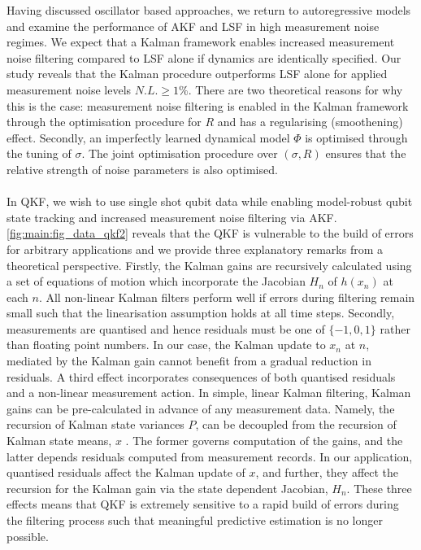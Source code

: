 Having discussed oscillator based approaches, we return to autoregressive models and examine the performance of AKF and LSF in high measurement noise regimes. We expect that a Kalman framework enables increased measurement noise filtering compared to LSF alone if dynamics are identically specified.  Our study reveals that the Kalman procedure outperforms LSF alone for applied measurement noise levels $N.L. \geq 1\%$. There are two theoretical reasons for why this is the case: measurement noise filtering is enabled in the Kalman framework through the optimisation procedure for $R$ and has a regularising (smoothening) effect. Secondly, an imperfectly learned dynamical model $\Phi$ is optimised through the tuning of $\sigma$. The joint optimisation procedure over $(\sigma, R)$ ensures that the relative strength of noise parameters is also optimised.
\\
\\
In QKF, we wish to use single shot qubit data while enabling model-robust qubit state tracking and increased measurement noise filtering via AKF. \cref{fig:main:fig_data_qkf2} reveals that the QKF is vulnerable to the build of errors for arbitrary applications and we provide three explanatory remarks from a theoretical perspective. Firstly, the Kalman gains are recursively calculated using a set of  equations of motion which incorporate the Jacobian $H_n$ of $h(x_n)$ at each $n$. All non-linear Kalman filters perform well if errors during filtering remain small such that the linearisation assumption holds at all time steps. Secondly, measurements are quantised and hence residuals must be one of $\{-1, 0, 1 \}$ rather than floating point numbers.  In our case, the Kalman update to $x_n$ at $n$, mediated by the Kalman gain cannot benefit from a gradual reduction in residuals. A third effect incorporates consequences of both quantised residuals and a non-linear measurement action. In simple, linear Kalman filtering, Kalman gains can be pre-calculated in advance of any measurement data. Namely, the recursion of Kalman state variances $P$, can be decoupled from the recursion of Kalman state means, $x$ \cite{grewal2001theory}. The former governs computation of the gains, and the latter depends residuals computed from measurement records. In our application, quantised residuals affect the Kalman update of $x$, and further, they affect the recursion for the Kalman gain via the state dependent Jacobian, $H_n$. These three effects means that QKF is extremely sensitive to a rapid build of errors during the filtering process such that meaningful predictive estimation is no longer possible.
